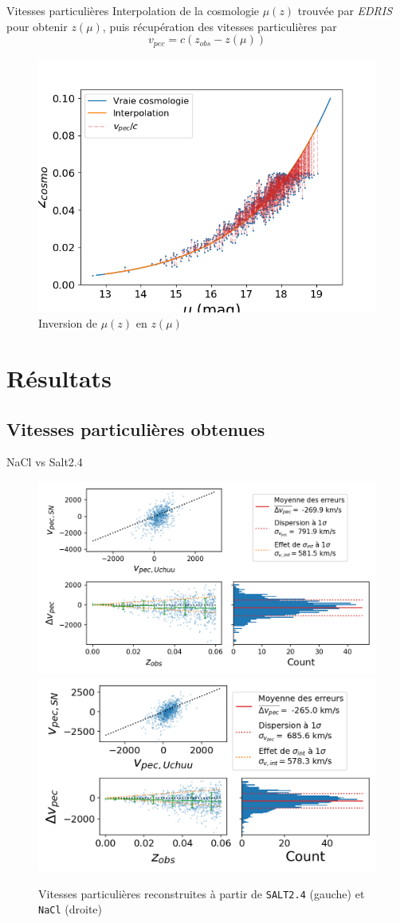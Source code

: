 \documentclass{beamer}
\begin{document}
\begin{frame}{Vitesses particulières}
Interpolation de la cosmologie $\mu(z)$ trouvée par \textit{EDRIS} pour obtenir $z(\mu)$, puis récupération des vitesses particulières par
\begin{equation}
	v_{pec} = c(z_{obs} - z(\mu))
\end{equation}
\begin{figure}
	\centering
	\includegraphics[width=.48\textwidth]{figures/z_mu.png}
	\caption{Inversion de $\mu(z)$ en $z(\mu)$}
\end{figure}
\end{frame}

\section{Résultats}

\subsection{Vitesses particulières obtenues}

\begin{frame}{NaCl vs Salt2.4}
\begin{figure}
	\centering
	\includegraphics[width=.48\textwidth, trim = {0 0 0 0}, clip]{figures/vp_salt.png}
	\includegraphics[width=.48\textwidth, trim = {0 0 0 0}, clip]{figures/vp_nacl.png}
	\caption{Vitesses particulières reconstruites à partir de \texttt{SALT2.4} (gauche) et \texttt{NaCl} (droite)}
\end{figure}
\end{frame}
\end{document}
